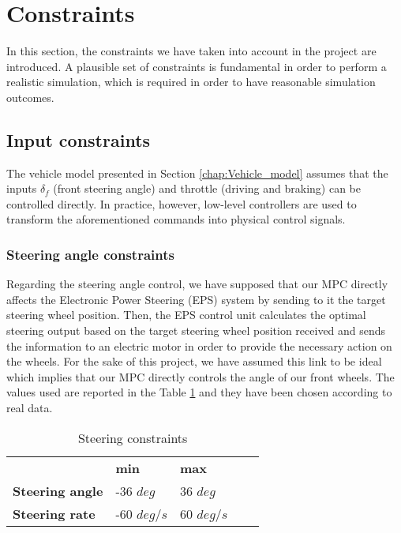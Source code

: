 \section{Constraints}
In this section, the constraints we have taken into account in the project are introduced. A plausible set of constraints is fundamental in order to perform a realistic simulation, which is required in order to have reasonable simulation outcomes. 
\subsection{Input constraints}

The vehicle model presented in Section \ref{chap:Vehicle_model} assumes that the inputs $\delta_f$ (front steering angle) and throttle (driving and braking) can be controlled
directly. In practice, however, low-level controllers are used to transform the aforementioned
commands into physical control signals.
\subsubsection{Steering angle constraints}
Regarding the steering angle control, we have supposed that our MPC directly affects the Electronic Power Steering (EPS) system by sending to it the target steering wheel position. Then, the EPS control unit calculates the optimal steering output based on the target steering wheel position received and sends the information to an electric motor in order to provide the necessary action on the wheels.
For the sake of this project, we have assumed this link to be ideal which implies that our MPC directly controls the angle of our front wheels. The values used are reported in the Table \ref{tab:steering} and they have been chosen according to real data\cite{forkenbrock2005assessment}.

\begin{table}[H]
\begin{center}
\begin{tabular}{lllll}
\cline{2-3}
\multicolumn{1}{l|}{}                         & \multicolumn{1}{l|}{\textbf{min}} & \multicolumn{1}{l|}{\textbf{max}} &  &  \\ \cline{1-3}
\multicolumn{1}{|l|}{\textbf{Steering angle}} & \multicolumn{1}{l|}{-36 $deg$}      & \multicolumn{1}{l|}{36 $deg$}      &  &  \\ \cline{1-3}
\multicolumn{1}{|l|}{\textbf{Steering rate}}  & \multicolumn{1}{l|}{-60 $deg/s$}    & \multicolumn{1}{l|}{60 $deg/s$}    &  &  \\ \cline{1-3}
\end{tabular}
\caption{Steering constraints}
\label{tab:steering}

\end{center}
\end{table}

